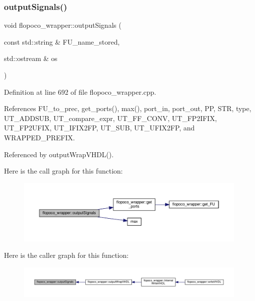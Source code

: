 \subsubsection{\texorpdfstring{output\+Signals()}{outputSignals()}}
{\footnotesize\ttfamily void flopoco\+\_\+wrapper\+::output\+Signals (\begin{DoxyParamCaption}\item[{const std\+::string \&}]{F\+U\+\_\+name\+\_\+stored,  }\item[{std\+::ostream \&}]{os }\end{DoxyParamCaption})\hspace{0.3cm}{\ttfamily [private]}}



Definition at line 692 of file flopoco\+\_\+wrapper.\+cpp.



References F\+U\+\_\+to\+\_\+prec, get\+\_\+ports(), max(), port\+\_\+in, port\+\_\+out, PP, S\+TR, type, U\+T\+\_\+\+A\+D\+D\+S\+UB, U\+T\+\_\+compare\+\_\+expr, U\+T\+\_\+\+F\+F\+\_\+\+C\+O\+NV, U\+T\+\_\+\+F\+P2\+I\+F\+IX, U\+T\+\_\+\+F\+P2\+U\+F\+IX, U\+T\+\_\+\+I\+F\+I\+X2\+FP, U\+T\+\_\+\+S\+UB, U\+T\+\_\+\+U\+F\+I\+X2\+FP, and W\+R\+A\+P\+P\+E\+D\+\_\+\+P\+R\+E\+F\+IX.



Referenced by output\+Wrap\+V\+H\+D\+L().

Here is the call graph for this function\+:
\nopagebreak
\begin{figure}[H]
\begin{center}
\leavevmode
\includegraphics[width=350pt]{d7/dbf/classflopoco__wrapper_a1220164a60b0fbd7e1257e1401dd0897_cgraph}
\end{center}
\end{figure}
Here is the caller graph for this function\+:
\nopagebreak
\begin{figure}[H]
\begin{center}
\leavevmode
\includegraphics[width=350pt]{d7/dbf/classflopoco__wrapper_a1220164a60b0fbd7e1257e1401dd0897_icgraph}
\end{center}
\end{figure}
\mbox{\label{classflopoco__wrapper_ad0575cadd6eee1f9c3bcdac90eb05b0e}} 
